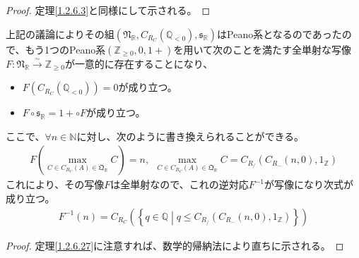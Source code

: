 \documentclass[dvipdfmx]{jsarticle}
\begin{document}
\begin{proof}
定理\ref{1.2.6.3}と同様にして示される。
\end{proof}
\begin{thm}\label{1.2.6.28}
上記の議論によりその組$\left( \mathfrak{N}_{\mathbb{R}},C_{R_{C}}\left( \mathbb{Q}_{< 0} \right),\mathfrak{s}_{\mathbb{R}} \right)$はPeano系となるのであったので、もう1つのPeano系$\left( \mathbb{Z}_{\geq 0},0,1 + \right)$を用いて次のことを満たす全単射な写像$F:\mathfrak{N}_{\mathbb{R}}\overset{\sim}{\rightarrow}\mathbb{Z}_{\geq 0}$が一意的に存在することになり、
\begin{itemize}
\item
  $F\left( C_{R_{C}}\left( \mathbb{Q}_{< 0} \right) \right) = 0$が成り立つ。
\item
  $F \circ \mathfrak{s}_{\mathbb{R}} = 1 + \circ F$が成り立つ。
\end{itemize}
ここで、$\forall n \in \mathbb{N}$に対し、次のように書き換えられることができる。
\begin{align*}
F\left( \max_{C \in C_{R_{C}}(A) \in \mathfrak{Q}_{\mathbb{R}}}C \right) = n,\ \ \max_{C \in C_{R_{C}}(A) \in \mathfrak{Q}_{\mathbb{R}}}C = C_{R_{/}}\left( C_{R_{-}}(n,0),1_{\mathbb{Z}} \right)
\end{align*}
これにより、その写像$F$は全単射なので、これの逆対応$F^{- 1}$が写像になり次式が成り立つ。
\begin{align*}
F^{- 1}(n) = C_{R_{C}}\left( \left\{ q \in \mathbb{Q} \middle| q \leq C_{R_{/}}\left( C_{R_{-}}(n,0),1_{\mathbb{Z}} \right) \right\} \right)
\end{align*}
\end{thm}
\begin{proof}
定理\ref{1.2.6.27}に注意すれば、数学的帰納法により直ちに示される。
\end{proof}
\end{document}
